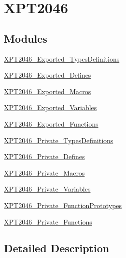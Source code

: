 \hypertarget{group___x_p_t2046}{}\section{X\+P\+T2046}
\label{group___x_p_t2046}
\subsection*{Modules}
\begin{DoxyCompactItemize}
\item 
\mbox{\hyperlink{group___x_p_t2046___exported___types_definitions}{X\+P\+T2046\+\_\+\+Exported\+\_\+\+Types\+Definitions}}
\item 
\mbox{\hyperlink{group___x_p_t2046___exported___defines}{X\+P\+T2046\+\_\+\+Exported\+\_\+\+Defines}}
\item 
\mbox{\hyperlink{group___x_p_t2046___exported___macros}{X\+P\+T2046\+\_\+\+Exported\+\_\+\+Macros}}
\item 
\mbox{\hyperlink{group___x_p_t2046___exported___variables}{X\+P\+T2046\+\_\+\+Exported\+\_\+\+Variables}}
\item 
\mbox{\hyperlink{group___x_p_t2046___exported___functions}{X\+P\+T2046\+\_\+\+Exported\+\_\+\+Functions}}
\item 
\mbox{\hyperlink{group___x_p_t2046___private___types_definitions}{X\+P\+T2046\+\_\+\+Private\+\_\+\+Types\+Definitions}}
\item 
\mbox{\hyperlink{group___x_p_t2046___private___defines}{X\+P\+T2046\+\_\+\+Private\+\_\+\+Defines}}
\item 
\mbox{\hyperlink{group___x_p_t2046___private___macros}{X\+P\+T2046\+\_\+\+Private\+\_\+\+Macros}}
\item 
\mbox{\hyperlink{group___x_p_t2046___private___variables}{X\+P\+T2046\+\_\+\+Private\+\_\+\+Variables}}
\item 
\mbox{\hyperlink{group___x_p_t2046___private___function_prototypes}{X\+P\+T2046\+\_\+\+Private\+\_\+\+Function\+Prototypes}}
\item 
\mbox{\hyperlink{group___x_p_t2046___private___functions}{X\+P\+T2046\+\_\+\+Private\+\_\+\+Functions}}
\end{DoxyCompactItemize}


\subsection{Detailed Description}
